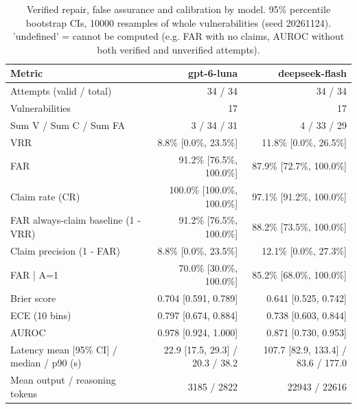\begin{table}[ht]
\centering
\caption{Verified repair, false assurance and calibration by model. 95\% percentile bootstrap CIs, 10000 resamples of whole vulnerabilities (seed 20261124). 'undefined' = cannot be computed (e.g. FAR with no claims, AUROC without both verified and unverified attempts).}
\label{tab:final-metrics}
\begin{tabular}{lrr}
\hline
Metric & gpt-6-luna & deepseek-flash \\
\hline
Attempts (valid / total) & 34 / 34 & 34 / 34 \\
Vulnerabilities & 17 & 17 \\
Sum V / Sum C / Sum FA & 3 / 34 / 31 & 4 / 33 / 29 \\
VRR & 8.8\% [0.0\%, 23.5\%] & 11.8\% [0.0\%, 26.5\%] \\
FAR & 91.2\% [76.5\%, 100.0\%] & 87.9\% [72.7\%, 100.0\%] \\
Claim rate (CR) & 100.0\% [100.0\%, 100.0\%] & 97.1\% [91.2\%, 100.0\%] \\
FAR always-claim baseline (1 - VRR) & 91.2\% [76.5\%, 100.0\%] & 88.2\% [73.5\%, 100.0\%] \\
Claim precision (1 - FAR) & 8.8\% [0.0\%, 23.5\%] & 12.1\% [0.0\%, 27.3\%] \\
FAR | A=1 & 70.0\% [30.0\%, 100.0\%] & 85.2\% [68.0\%, 100.0\%] \\
Brier score & 0.704 [0.591, 0.789] & 0.641 [0.525, 0.742] \\
ECE (10 bins) & 0.797 [0.674, 0.884] & 0.738 [0.603, 0.844] \\
AUROC & 0.978 [0.924, 1.000] & 0.871 [0.730, 0.953] \\
Latency mean [95\% CI] / median / p90 (s) & 22.9 [17.5, 29.3] / 20.3 / 38.2 & 107.7 [82.9, 133.4] / 83.6 / 177.0 \\
Mean output / reasoning tokens & 3185 / 2822 & 22943 / 22616 \\
\hline
\end{tabular}
\end{table}
